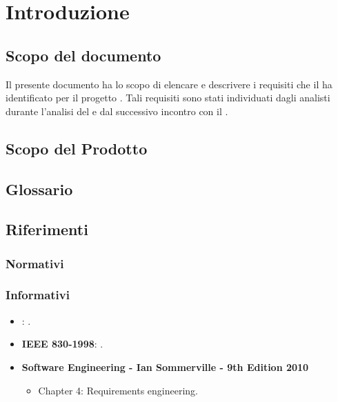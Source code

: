 \section{Introduzione}
\subsection{Scopo del documento}
Il presente documento ha lo scopo di elencare e descrivere i requisiti che il  ha identificato per il progetto \progettoShort. Tali requisiti sono stati individuati dagli analisti durante l'analisi del  e dal successivo incontro con il .
\subsection{Scopo del Prodotto}
\scopoProdotto

\subsection{Glossario}
\descrizioneGlossario

\subsection{Riferimenti}
\subsubsection{Normativi}
\riferimentiNormativi

\subsubsection{Informativi}
\begin{itemize}
\item \textbf{\SdF}: \studioDiFattibilita.
\item \textbf{IEEE 830-1998}: .
\item \textbf{Software Engineering - Ian Sommerville - 9th Edition 2010}
	\begin{itemize}
	\item Chapter 4: Requirements engineering.
	\end{itemize}
\end{itemize}

\newpage


